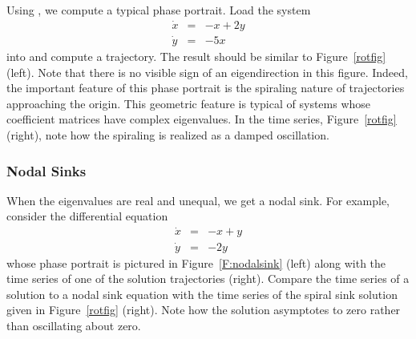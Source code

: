 \documentclass{ximera}
\begin{document}
Using {\pplane}, we compute a typical
phase portrait.  Load the system
\begin{equation} \label{e:complex2}
\begin{array}{rcl}
\dot{x} & = & -x + 2y \\
\dot{y} & = & -5x
\end{array}
\end{equation}
into {\pplane} and compute a trajectory.  The result should
be similar to Figure~\ref{rotfig} (left).  Note that there is no
visible sign of an eigendirection in this figure.
Indeed, the important feature of this phase portrait is the spiraling
nature of trajectories approaching the origin.  This geometric feature
is typical of systems whose coefficient matrices have complex
eigenvalues.  In the time series, Figure~\ref{rotfig} (right),
note how the spiraling is realized as a damped oscillation.

\begin{figure*}[htb]
        \centerline{%
        }
        \caption{(Left) Phase plane for \protect\eqref{e:complex2}
              for $x,y\in [-5,5]$.  (Right) Time series $y$ versus $t$
	      of solution}
        \label{rotfig}
\end{figure*}




\subsubsection*{Nodal Sinks}

When the eigenvalues are real and unequal, we get a nodal sink.
For example, consider the differential equation
\begin{eqnarray*}
\dot{x} & = & -x+y \\
\dot{y} & = & -2y
\end{eqnarray*}
whose phase portrait is pictured
in Figure~\ref{F:nodalsink} (left)
along with the time series of one of the solution trajectories (right).
Compare the time series of a solution to a nodal sink equation
with the time series of the spiral sink solution given in
Figure~\ref{rotfig} (right).  Note how the solution asymptotes
to zero rather than oscillating about zero.

\begin{figure*}[htb]
           \centerline{%
           }
           \caption{(Left) Phase plane of nodal sink.
	(Right) Time series of a typical trajectory.}
           \label{F:nodalsink}
\end{figure*}
\end{document}
